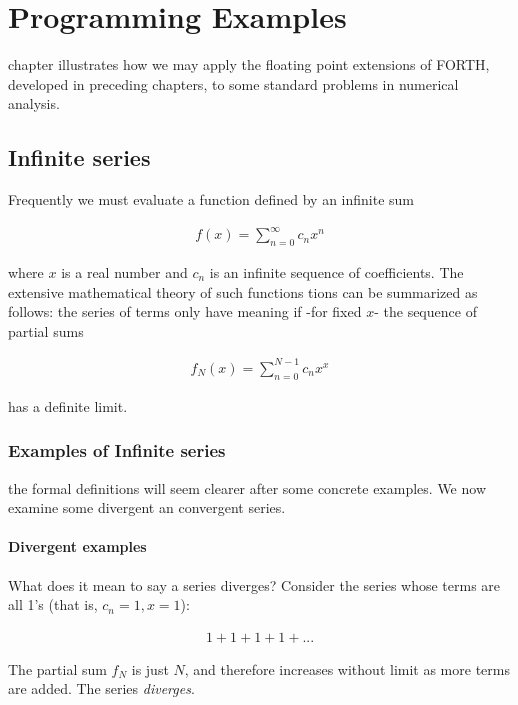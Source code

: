 \chapter{Programming Examples}

 chapter illustrates how we may apply the floating point extensions of FORTH, developed in preceding chapters, to some standard problems in numerical analysis.

\section{Infinite series}

Frequently we must evaluate a function defined by an infinite sum

\begin{align}
    f(x) = \sum_{n=0}^{\infty}c_{n}x^{n}
    \label{eq:06_01}
\end{align}

where $x$ is a real number and $c_n$ is an infinite sequence of coefficients. The extensive mathematical theory of such functions tions can be summarized as follows: the series of terms only have meaning if -for fixed $x$- the sequence of partial sums

\begin{align}
    f_{N}(x) = \sum_{n=0}^{N-1}c_{n}x^{x}
\end{align}

has a definite limit.

\subsection{Examples of Infinite series}
 the formal definitions will seem clearer after some concrete examples. We now examine some divergent an convergent series.

\subsubsection{Divergent examples}
What does it mean to say a series diverges? Consider the series whose terms are all 1's (that is, $c_n = 1, x = 1$):

\begin{align}
    1 + 1 + 1 + 1 + ...
\end{align}

The partial sum $f_N$ is just $N$, and therefore increases without limit as more terms are added. The series \textit{diverges}.


